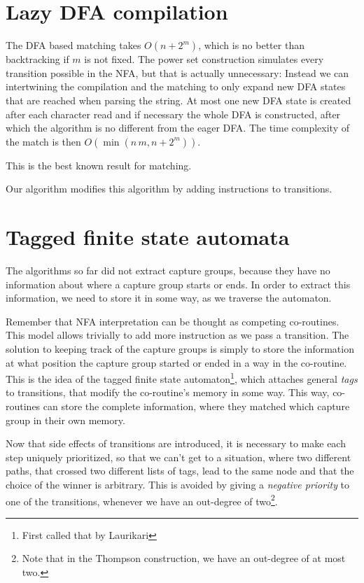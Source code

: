 \documentclass[11pt,a4paper,twoside,openright]{Thesis}
\theoremstyle{definition}
\newcommand{\seclabel}[1]{\label{sec:#1}}
\begin{document}
\section{Lazy DFA compilation}\label{sec:lazy-dfa-match}
The DFA based matching takes $O(n + 2^m)$, which is no better than backtracking
if $m$ is not fixed. The power set construction simulates every transition
possible in the NFA, but that is actually unnecessary: Instead we can
intertwining the compilation and the matching to only expand new DFA states that
are reached when parsing the string. At most one new DFA state is created after
each character read and if necessary the whole DFA is constructed, after
which the algorithm is no different from the eager DFA\@. The time complexity of
the match is then $O(\min(n\, m, n+2^m))$.

This is the best known result for matching\cite{Cox07a,Cox09a,Cox10a}.

Our algorithm modifies this algorithm by adding instructions to transitions.

\section{Tagged finite state automata}\seclabel{tfsa}
The algorithms so far did not extract capture groups, because they have no
information about where a capture group starts or ends. In order to extract
this information, we need to store it in some way, as we traverse the
automaton.

Remember that NFA interpretation can be thought as competing co-routines.
This model allows trivially to add more instruction as we pass a transition.
The solution to keeping track of the capture groups is simply to store the
information at what position the capture group started or ended in a way in
the co-routine. This is the idea of the tagged finite state
automaton\footnote{First called that by Laurikari\cite{Laur00a}}, which
attaches general \emph{tags} to transitions, that modify the co-routine's
memory in some way. This way, co-routines can store the complete information,
where they matched which capture group in their own memory.

Now that side effects of transitions are introduced, it is necessary to make
each step uniquely prioritized, so that we can't get to a situation, where
two different paths, that crossed two different lists of tags, lead to the
same node and that the choice of the winner is arbitrary. This is avoided by
giving a \emph{negative priority} to one of the transitions, whenever we have
an out-degree of two\footnote{Note that in the Thompson construction, we have
an out-degree of at most two.}.
\end{document}
